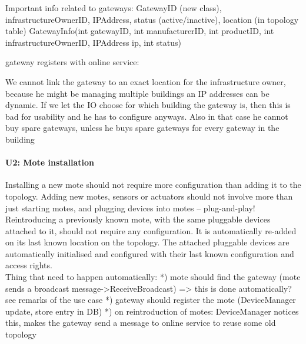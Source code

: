             Important info related to gateways: GatewayID (new class), infrastructureOwnerID, IPAddress, status (active/inactive), location (in topology table)
                GatewayInfo(int gatewayID, int manufacturerID, int productID, int infrastructureOwnerID, IPAddress ip, int status)

            gateway registers with online service:

                We cannot link the gateway to an exact location for the infrastructure owner, because he might be managing multiple buildings
                an IP addresses can be dynamic. If we let the IO choose for which building the gateway is, then this is bad for usability and
                he has to configure anyways. Also in that case he cannot buy spare gateways, unless he buys spare gateways for every gateway in the building

        \paragraph{U2: Mote installation}
            Installing a new mote should not require more configuration than adding it
            to the topology. Adding new motes, sensors or actuators should not involve
            more than just starting motes, and plugging devices into motes – plug-and-play!
            Reintroducing a previously known mote, with the same pluggable devices attached to it,
            should not require any configuration. It is automatically re-added on
            its last known location on the topology. The attached pluggable devices
            are automatically initialised and configured with their last known
            configuration and access rights. \\
            Thing that need to happen automatically:
            *) mote should find the gateway (mote sends a broadcast message->ReceiveBroadcast) => this is done automatically? see remarks of the use case
            *) gateway should register the mote (DeviceManager update, store entry in DB)
            *) on reintroduction of motes: DeviceManager notices this, makes the gateway send a message to online service to reuse some old topology

